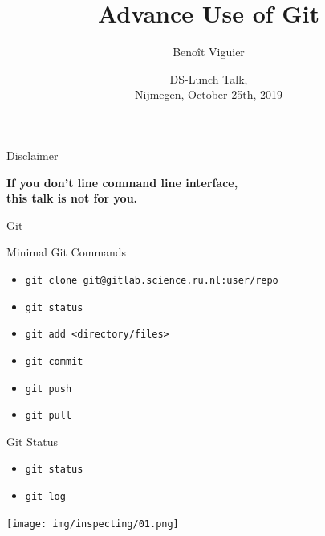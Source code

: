 \documentclass[usenames,dvipsnames,9pt]{beamer}
\title{Advance Use of Git}
\author[Viguier]
{Beno\^{i}t Viguier}
\date[Short Occasion]{\vspace{0.5cm}DS-Lunch Talk,\\Nijmegen, October 25th, 2019}
\begin{document}

\begin{frame}
  \titlepage
\end{frame}


\begin{frame}{Disclaimer}
\begin{center}
  \alert{\Large{\textbf{If you don't line command line interface,\\this talk is not for you.}}}
\end{center}
\end{frame}


\begin{frame}{Git}

\end{frame}

\begin{frame}{Minimal Git Commands}
  \begin{itemize}
    \item \lstinline|git clone git@gitlab.science.ru.nl:user/repo|
    \item \lstinline|git status|
    \item \lstinline|git add <directory/files>|
    \item \lstinline|git commit|
    \item \lstinline|git push|
    \item \lstinline|git pull|
  \end{itemize}
\end{frame}



%
%
\begin{frame}{Git Status}
\begin{itemize}
  \item \lstinline|git status|
  \item \lstinline|git log|
\end{itemize}

\texttt{[image: img/inspecting/01.png]}
\end{frame}
\end{document}
